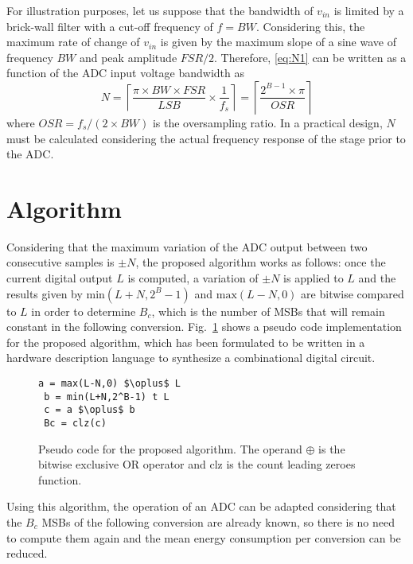 \documentclass[twocolumn]{el-author}
\begin{document}
For illustration purposes, let us suppose that the bandwidth of $v_{in}$ is limited by a brick-wall filter with a \mbox{cut-off} frequency of \mbox{$f=\mathit{BW}$}. Considering this, the maximum rate of change of $v_{in}$ is given by the maximum slope of a sine wave of frequency $BW$ and peak amplitude $\mathit{FSR}/2$. Therefore, \eqref{eq:N1} can be written as a function of the ADC input voltage bandwidth as
\begin{equation}
N = \left\lceil \frac{\pi \times \mathit{BW} \times \mathit{FSR}}{\mathit{LSB}} \times \frac{1}{f_s}\right\rceil  = \left\lceil \frac{2^{B-1}\times\pi}{\mathit{OSR}}\right\rceil \label{eq:Nfinal}
\end{equation}
where $\mathit{OSR}=f_s/\left(2\times\mathit{BW}\right)$ is the oversampling ratio. In a practical design, $N$ must be calculated considering the actual frequency response of the stage prior to the ADC.

\section{Algorithm}
Considering that the maximum variation of the ADC output between two consecutive samples is $\pm N$, the proposed algorithm works as follows: once the current digital output $L$ is computed, a variation of $\pm N$ is applied to $L$ and the results given by \mbox{$\text{min}(L+N, 2^B-1)$} and \mbox{$\text{max}(L-N,0)$} are bitwise compared to $L$ in order to determine $B_c$, which is the number of MSBs that will remain constant in the following conversion. Fig.~\ref{fig:algorithm} shows a pseudo code implementation for the proposed algorithm, which has been formulated to be written in a hardware description language to synthesize a combinational digital circuit.
\begin{figure}[!h]
\centering
\begin{lstlisting}[mathescape]
 a = max(L-N,0) $\oplus$ L
 b = min(L+N,2^B-1) t L
 c = a $\oplus$ b
 Bc = clz(c)
\end{lstlisting}
\caption{Pseudo code for the proposed algorithm. The operand $\oplus$ is the bitwise exclusive OR operator and clz is the count leading zeroes function.}\label{fig:algorithm}
\end{figure}

Using this algorithm, the operation of an ADC can be adapted considering that the $\mathit{B}_c$ MSBs of the following conversion are already known, so there is no need to compute them again and the mean energy consumption per conversion can be reduced.
\end{document}
